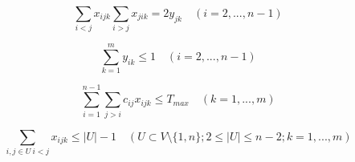 \begin{equation}
\sum_{i<j} x_{ijk} \sum_{i>j} x_{jik} = 2y_{jk} \quad (i =2,...,n-1)
\end{equation}

\begin{equation}
\sum_{k=1}^{m} y_{ik} \leq 1 \quad (i =2,...,n-1)
\end{equation}

\begin{equation}
\sum_{i=1}^{n-1} \sum_{j>i} c_{ij}x_{ijk} \leq T_{max} \quad (k=1,...,m)
\end{equation}

\begin{equation}
\sum_{i,j\in U \ i<j} x_{ijk} \leq |U|-1 \quad (U \subset V \setminus \{1,n\} ; 2 \leq |U| \leq n-2; k=1,...,m)
\end{equation}




